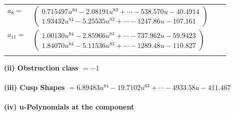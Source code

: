 \documentclass[1p]{elsarticle_modified}
\theoremstyle{definition}
\begin{document}
\begin{tabular}{m{7pt} m{180pt} m{7pt} m{180pt} }
\flushright $a_{8}=$&$\begin{pmatrix}0.715497 u^{84}-2.08191 u^{83}+\cdots-538.570 u-40.4914\\1.93432 u^{84}-5.25535 u^{83}+\cdots-1247.86 u-107.161\end{pmatrix}$ \\
\flushright $a_{11}=$&$\begin{pmatrix}1.00130 u^{84}-2.85966 u^{83}+\cdots-737.962 u-59.9423\\1.84070 u^{84}-5.11536 u^{83}+\cdots-1289.48 u-110.827\end{pmatrix}$\\&\end{tabular}
\flushleft \textbf{(ii) Obstruction class $= -1$}\\~\\
\flushleft \textbf{(iii) Cusp Shapes $= 6.89483 u^{84}-19.7102 u^{83}+\cdots-4933.58 u-411.467$}\\~\\
\newpage\renewcommand{\arraystretch}{1}
\flushleft \textbf{(iv) u-Polynomials at the component}\newline \\
\end{document}

